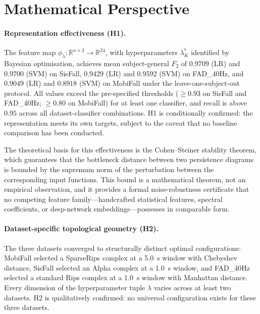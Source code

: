\documentclass[onluarkali,ingilizce,yukseklisans,karton,LisansustuEgitim]{itutez}
\providecommand{\R}{\mathbb{R}}
\providecommand{\1}{\mathbf{1}}
\begin{document}
\section{Mathematical Perspective}
\label{subsec:conclusion-math}

\paragraph{Representation effectiveness (H1).}
The feature map $\phi_\lambda\colon\R^{n\times 3}\to\R^{24}$, with hyperparameters
$\lambda^*_K$ identified by Bayesian optimisation, achieves mean subject-general
$F_2$ of $0.9709$ (LR) and $0.9700$ (SVM) on SisFall, $0.9429$ (LR) and
$0.9592$ (SVM) on FAD\_40Hz, and $0.9049$ (LR) and $0.8918$ (SVM) on MobiFall
under the leave-one-subject-out protocol.  All values exceed the pre-specified
thresholds ($\geq 0.93$ on SisFall and FAD\_40Hz; $\geq 0.80$ on MobiFall) for at
least one classifier, and recall is above $0.95$ across all dataset-classifier
combinations.  H1 is conditionally confirmed: the representation meets its own
targets, subject to the caveat that no baseline comparison has been conducted.

The theoretical basis for this effectiveness is the Cohen--Steiner stability
theorem, which guarantees that the bottleneck distance between two persistence
diagrams is bounded by the supremum norm of the perturbation between the
corresponding input functions.  This bound is a mathematical theorem, not an
empirical observation, and it provides a formal noise-robustness certificate that
no competing feature family---handcrafted statistical features, spectral
coefficients, or deep-network embeddings---possesses in comparable form.

\paragraph{Dataset-specific topological geometry (H2).}
The three datasets converged to structurally distinct optimal configurations:
MobiFall selected a SparseRips complex at a 5.0~s window with Chebyshev distance,
SisFall selected an Alpha complex at a 1.0~s window, and FAD\_40Hz selected a
standard Rips complex at a 1.0~s window with Manhattan distance.  Every dimension of
the hyperparameter tuple $\lambda$ varies across at least two datasets.  H2 is
qualitatively confirmed: no universal configuration exists for these three datasets.
\end{document}
